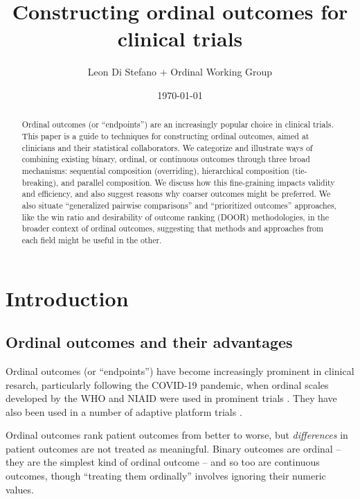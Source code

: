 \documentclass[
  11pt,
  fleqn
]{article}
\title{Constructing ordinal outcomes for clinical trials}
\author{Leon Di Stefano + Ordinal
Working Group}
\date{\today}
\begin{document}
\maketitle

\begin{abstract}
  Ordinal outcomes (or ``endpoints'') are an increasingly popular choice in
  clinical trials.
  This paper is a guide to techniques for constructing ordinal
  outcomes, aimed at clinicians and their statistical collaborators.
  We categorize and illustrate ways of combining existing binary,
  ordinal, or continuous
  outcomes through three broad mechanisms: sequential composition
  (overriding), hierarchical composition (tie-breaking), and parallel
  composition.
  We discuss how this fine-graining impacts validity and efficiency, and also
  suggest reasons why coarser outcomes might be preferred.
  We also situate ``generalized pairwise comparisons'' and
  ``prioritized outcomes'' approaches, like the win
  ratio and desirability of outcome
  ranking (DOOR) methodologies, in the broader context of ordinal
  outcomes, suggesting that methods and approaches from each field
  might be useful in the other.
\end{abstract}

\tableofcontents
\newpage

\section{Introduction}

\subsection{Ordinal outcomes and their advantages}

Ordinal outcomes (or ``endpoints'') have become increasingly
prominent in clinical
resarch, particularly following the COVID-19 pandemic, when ordinal
scales developed by the WHO and NIAID were used in prominent trials
\citep{beigelRemdesivirTreatmentCovid192020,
marshallMinimalCommonOutcome2020}. They have also
been used in a number of adaptive platform trials
\citep{angusREMAPCAPRandomizedEmbedded2020, walkerCodesigningNovelOrdinal2025}.

Ordinal outcomes rank patient outcomes from better to worse, but
\emph{differences} in patient outcomes are
not treated as meaningful. Binary
outcomes are ordinal -- they are the simplest kind of
ordinal outcome -- and so too are continuous outcomes, though
``treating them ordinally'' involves ignoring their numeric values.
\end{document}
